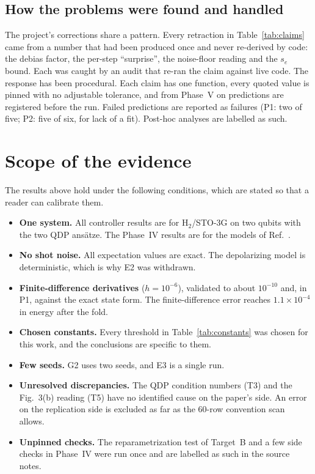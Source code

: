 \documentclass[aps,pra,reprint,superscriptaddress,nofootinbib]{revtex4-2}
\begin{document}
\subsection{How the problems were found and handled}

The project's corrections share a pattern. Every retraction in Table~\ref{tab:claims} came from
a number that had been produced once and never re-derived by code: the debias factor, the
per-step ``surprise'', the noise-floor reading and the $s_e$ bound. Each was caught by an
audit that re-ran the claim against live code. The response has been procedural. Each claim
has one function, every quoted value is pinned with no adjustable tolerance, and from
Phase~V on predictions are registered before the run. Failed predictions are reported as
failures (P1: two of five; P2: five of six, for lack of a fit). Post-hoc analyses are labelled
as such.

\section{Scope of the evidence}
\label{sec:scope}

The results above hold under the following conditions, which are stated so that a reader can
calibrate them.
\begin{itemize}
\setlength\itemsep{0pt}
\item \textbf{One system.} All controller results are for H$_2$/STO-3G on two qubits with the
  two QDP ansätze. The Phase~IV results are for the models of Ref.~\cite{BeyondTrot2026}.
\item \textbf{No shot noise.} All expectation values are exact. The depolarizing model is
  deterministic, which is why E2 was withdrawn.
\item \textbf{Finite-difference derivatives} ($h=10^{-6}$), validated to about $10^{-10}$ and,
  in P1, against the exact state form. The finite-difference error reaches $1.1\times10^{-4}$ in
  energy after the fold.
\item \textbf{Chosen constants.} Every threshold in Table~\ref{tab:constants} was chosen for this work,
  and the conclusions are specific to them.
\item \textbf{Few seeds.} G2 uses two seeds, and E3 is a single run.
\item \textbf{Unresolved discrepancies.} The QDP condition numbers (T3) and the Fig.~3(b)
  reading (T5) have no identified cause on the paper's side. An error on the replication side is
  excluded as far as the 60-row convention scan allows.
\item \textbf{Unpinned checks.} The reparametrization test of Target~B and a few side checks in
  Phase~IV were run once and are labelled as such in the source notes.
\end{itemize}
\end{document}
